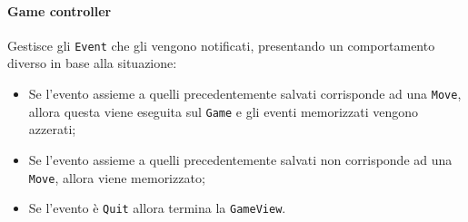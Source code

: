 \paragraph{Game controller}
%
Gestisce gli \texttt{Event} che gli vengono notificati, presentando un comportamento diverso in base alla situazione:
\begin{itemize}
    \item Se l'evento assieme a quelli precedentemente salvati corrisponde ad una \texttt{Move}, allora questa viene eseguita sul \texttt{Game} e gli eventi memorizzati vengono azzerati;
    \item Se l'evento assieme a quelli precedentemente salvati non corrisponde ad una \texttt{Move}, allora viene memorizzato;
    \item Se l'evento è \texttt{Quit} allora termina la \texttt{GameView}.
\end{itemize}
